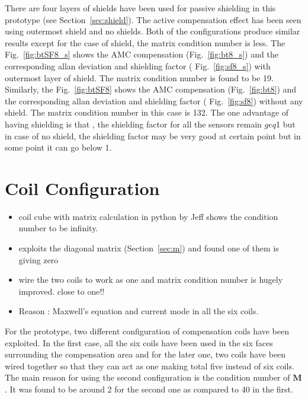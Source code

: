 There are four layers of shields have been used for passive shielding in this prototype (see Section~\ref{sec:shield}). The active compensation effect has been seen using outermost shield and no shields. Both of the configurations produce similar results except for the case of shield, the matrix condition number is less. The Fig.~\ref{fig:btSF8_s} shows the AMC compensation (Fig.~\ref{fig:bt8_s}) and the corresponding allan deviation and shielding factor ( Fig.~\ref{fig:sf8_s}) with outermost layer of shield. The matrix condition number is found to be 19. Similarly, the Fig.~\ref{fig:btSF8} shows the AMC compensation (Fig.~\ref{fig:bt8}) and the corresponding allan deviation and shielding factor ( Fig.~\ref{fig:sf8}) without any shield. The matrix condition number in this case is 132. The one advantage of having shielding is that , the shielding factor for all the sensors remain $geq$1 but in case of no shield, the shielding factor may be very good at certain point but in some point it can go below 1.




\section{Coil Configuration}

\begin{itemize}
\item coil cube with matrix calculation in python by Jeff shows the condition number to be infinity.
\item exploits the diagonal matrix (Section~\ref{sec:m}) and found one of them is giving zero
\item wire the two coils to work as one and matrix condition number is hugely improved. close to one!!
\item Reason : Maxwell's equation and current mode in all the six coils.
\end{itemize}




For the prototype, two different configuration of compensation coils have been exploited. In the first case, all the six coils have been used in the six faces surrounding the compensation area and for the later one, two coils have been wired together so that they can act as one making total five instead of six coils. The main reason for using the second configuration is the condition number of $\bm{M}$. It was found to be around 2 for the second one as compared to 40 in the first.

